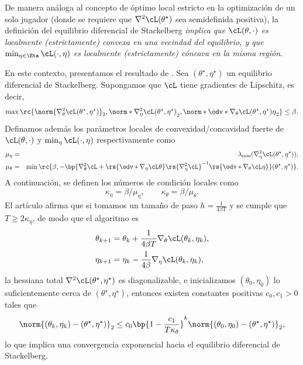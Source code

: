 \documentclass[../../book-main_es.tex]{subfiles}
\begin{document}
De manera análoga al concepto de óptimo local estricto en la optimización de un solo jugador
(donde se requiere que \(\nabla^{2}\cL(\theta^{\star})\) sea
semidefinida positiva), la definición del equilibrio diferencial de Stackelberg
\textit{implica que \(\cL(\theta, \cdot)\) es localmente
    (estrictamente) convexa en una vecindad del equilibrio, y que
    \(\min_{\eta \in \Eta}\cL(\cdot, \eta)\) es localmente (estrictamente)
cóncava en la misma región}.

En este contexto, presentamos el resultado de \cite{li2022convergence}.
Sea \((\theta^{\star}, \eta^{\star})\) un equilibrio diferencial de Stackelberg.
Supongamos que \(\cL\) tiene gradientes de Lipschitz, es decir,
\begin{equation}
    \max\rc{\norm{\nabla_{\theta}^{2}\cL(\theta^{\star},
        \eta^{\star})}_{2}, \norm*{\nabla_{\eta}^{2}\cL(\theta^{\star},
        \eta^{\star})}_{2},
        \norm*{\odv*{\nabla_{\theta}\cL(\theta^{\star},
    \eta^{\star})}{\eta}}_{2}} \leq \beta.
\end{equation}
Definamos además los parámetros locales de convexidad/concavidad fuerte de
\(\cL(\theta, \cdot)\) y \(\min_{\eta}\cL(\cdot, \eta)\) respectivamente como
\begin{eqnarray}
    \mu_{\eta} &=& \lambda_{\min}(\nabla_{\eta}^{2}\cL(\theta^{\star},
    \eta^{\star})), \\ \mu_{\theta} &=& \min\rc{\beta,
        -\bp{\nabla_{\theta}^{2}\cL +
        \rs{\odv*{\nabla_{\eta}\cL}{\theta}}\rs{\nabla_{\eta}^{2}\cL}^{-1}\rs{\odv*{\nabla_{\theta}\cL}{\eta}}}(\theta^{\star},
    \eta^{\star})}.
\end{eqnarray}
A continuación, se definen los números de condición locales como
\begin{equation}
    \kappa_{\eta} = \beta/\mu_{\eta}, \qquad \kappa_{\theta} = \beta/\mu_{\theta}.
\end{equation}
El artículo \cite{li2022convergence} afirma que si tomamos un tamaño de paso \(h
= \frac{1}{4\beta T}\) y se cumple que \(T \geq 2\kappa_{\eta}\), de modo que el algoritmo es
\begin{align}
    \theta_{k + 1}
    &= \theta_{k} + \frac{1}{4\beta T}\nabla_{\theta} \cL(\theta_{k},
    \eta_{k}), \\
    \eta_{k + 1}
    &= \eta_{k} - \frac{1}{4\beta}\nabla_{\eta} \cL(\theta_{k}, \eta_{k}),
\end{align}
la hessiana total \(\nabla^{2}\cL(\theta^{\star}, \eta^{\star})\) es
diagonalizable, e inicializamos \((\theta_{0}, \eta_{0})\) lo suficientemente cerca
de \((\theta^{\star}, \eta^{\star})\), entonces existen constantes positivas
\(c_{0}, c_{1} > 0\) tales que
\begin{equation}
    \norm{(\theta_{k}, \eta_{k}) - (\theta^{\star},
    \eta^{\star})}_{2} \leq c_{0}\bp{1 -
    \frac{c_{1}}{T\kappa_{\theta}}}^{k}\norm{(\theta_{0}, \eta_{0}) -
    (\theta^{\star}, \eta^{\star})}_{2},
\end{equation}
lo que implica una convergencia exponencial hacia el equilibrio diferencial de Stackelberg.
\end{document}
